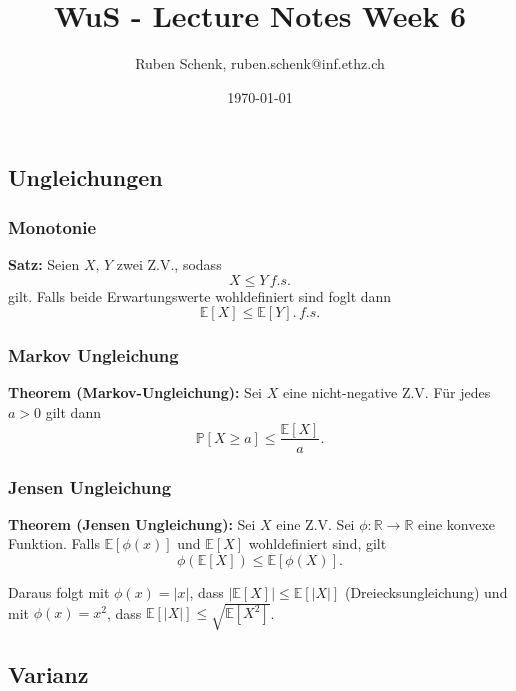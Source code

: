 \documentclass[a4paper]{extarticle}
\title{WuS - Lecture Notes Week 6}
\author{Ruben Schenk, ruben.schenk@inf.ethz.ch}
\date{\today}
\begin{document}
\maketitle

\subsection{Ungleichungen}

\subsubsection{Monotonie}

\begin{cbox}
    \textbf{Satz:} Seien $X, \, Y$ zwei Z.V., sodass
    \[
        X \leq Y \, f.s.
    \]
    gilt. Falls beide Erwartungswerte wohldefiniert sind foglt dann
    \[
        \mathbb{E}[X] \leq \mathbb{E}[Y]. \, f.s.
    \]
\end{cbox}

\subsubsection{Markov Ungleichung}

\begin{tbox}
    \textbf{Theorem (Markov-Ungleichung):} Sei $X$ eine nicht-negative Z.V. Für jedes $a > 0$ gilt dann
    \[
        \mathbb{P}[X \geq a] \leq \frac{\mathbb{E}[X]}{a}.
    \]
\end{tbox}

\subsubsection{Jensen Ungleichung}

\begin{tbox}
    \textbf{Theorem (Jensen Ungleichung):} Sei $X$ eine Z.V. Sei $\phi : \mathbb{R} \to \mathbb{R}$ eine konvexe Funktion. Falls $\mathbb{E}[\phi(x)]$ und $\mathbb{E}[X]$ wohldefiniert sind, gilt
    \[
        \phi(\mathbb{E}[X]) \leq \mathbb{E}[\phi(X)].
    \]
\end{tbox}

Daraus folgt mit $\phi(x) = |x|$, dass $|\mathbb{E}[X]| \leq \mathbb{E}[|X|]$ (Dreiecksungleichung) und mit $\phi(x) = x^2$, dass $\mathbb{E}[|X|] \leq \sqrt{\mathbb{E}[X^2]}$.

\subsection{Varianz}
\end{document}

